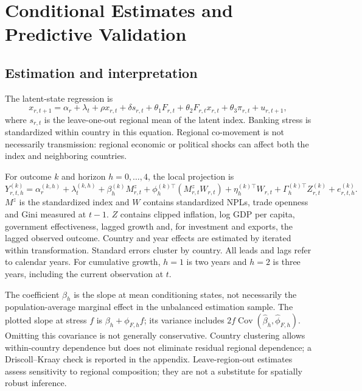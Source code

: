 \section{Conditional Estimates and Predictive Validation}\label{sec:empirics}

\subsection{Estimation and interpretation}\label{subsec:estimation}
The latent-state regression is
\begin{equation}\label{eq:stateemp}
 x_{r,t+1}=\alpha_r+\lambda_t+\rho x_{r,t}+\delta s_{r,t}
 +\theta_1 F_{r,t}+\theta_2F_{r,t}x_{r,t}+\theta_3\pi_{r,t}+u_{r,t+1},
\end{equation}
where $s_{r,t}$ is the leave-one-out regional mean of the latent index.
Banking stress is standardized within country in this equation. Regional
co-movement is not necessarily transmission: regional economic or political
shocks can affect both the index and neighboring countries.

For outcome $k$ and horizon $h=0,\ldots,4$, the local projection is
\begin{equation}\label{eq:lp}
 Y^{(k)}_{r,t,h}=\alpha^{(k,h)}_r+\lambda^{(k,h)}_t+
 \beta^{(k)}_h M^z_{r,t}+\phi^{(k)\top}_h(M^z_{r,t}W_{r,t})
 +\eta^{(k)\top}_hW_{r,t}+\Gamma^{(k)\top}_h Z^{(k)}_{r,t}
 +e^{(k)}_{r,t,h}.
\end{equation}
$M^z$ is the standardized index and $W$ contains standardized NPLs, trade
openness and Gini measured at $t-1$. $Z$ contains clipped inflation, log GDP per capita,
government effectiveness, lagged growth and, for investment and exports, the
lagged observed outcome. Country and year effects are estimated by iterated
within transformation. Standard errors cluster by country. All leads and
lags refer to calendar years. For cumulative growth, $h=1$ is two years and
$h=2$ is three years, including the current observation at $t$.

The coefficient $\beta_h$ is the slope at mean conditioning states, not
necessarily the population-average marginal effect in the unbalanced
estimation sample. The plotted slope at stress $f$ is $\beta_h+\phi_{F,h}f$;
its variance includes $2f\operatorname{Cov}(\hat\beta_h,\hat\phi_{F,h})$.
Omitting this covariance is not generally conservative. Country clustering
allows within-country dependence but does not eliminate residual regional
dependence; a Driscoll--Kraay check is reported in the appendix. Leave-region-out estimates assess sensitivity to regional
composition; they are not a substitute for spatially robust inference.

